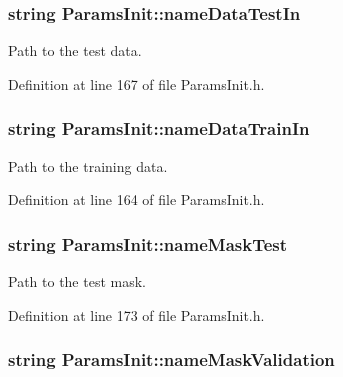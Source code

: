 \subsubsection[{\texorpdfstring{name\+Data\+Test\+In}{nameDataTestIn}}]{\setlength{\rightskip}{0pt plus 5cm}string Params\+Init\+::name\+Data\+Test\+In}\hypertarget{classParamsInit_a767cac558a94a14a9b4ea3fc5693747c}{}\label{classParamsInit_a767cac558a94a14a9b4ea3fc5693747c}


Path to the test data. 



Definition at line 167 of file Params\+Init.\+h.

\subsubsection[{\texorpdfstring{name\+Data\+Train\+In}{nameDataTrainIn}}]{\setlength{\rightskip}{0pt plus 5cm}string Params\+Init\+::name\+Data\+Train\+In}\hypertarget{classParamsInit_a8ccf3dc572e5db746f8f8f865f58cfea}{}\label{classParamsInit_a8ccf3dc572e5db746f8f8f865f58cfea}


Path to the training data. 



Definition at line 164 of file Params\+Init.\+h.

\subsubsection[{\texorpdfstring{name\+Mask\+Test}{nameMaskTest}}]{\setlength{\rightskip}{0pt plus 5cm}string Params\+Init\+::name\+Mask\+Test}\hypertarget{classParamsInit_ac2da7da7a633fff9ac0b95f08a135aaf}{}\label{classParamsInit_ac2da7da7a633fff9ac0b95f08a135aaf}


Path to the test mask. 



Definition at line 173 of file Params\+Init.\+h.

\subsubsection[{\texorpdfstring{name\+Mask\+Validation}{nameMaskValidation}}]{\setlength{\rightskip}{0pt plus 5cm}string Params\+Init\+::name\+Mask\+Validation}\hypertarget{classParamsInit_a2c6331d140b040ecda807c8749d3199c}{}\label{classParamsInit_a2c6331d140b040ecda807c8749d3199c}



